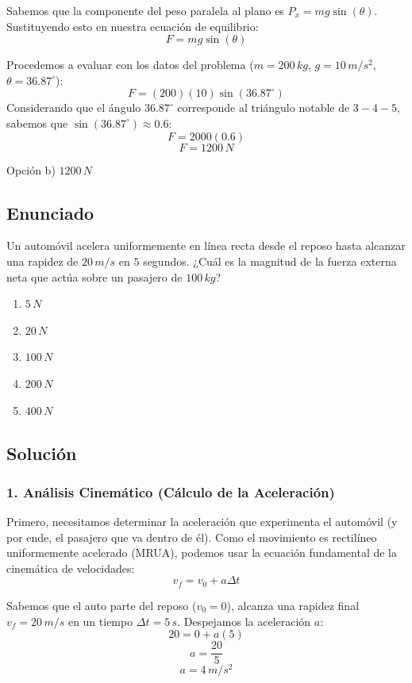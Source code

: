 \documentclass[12pt, a4paper]{article}
\begin{document}
Sabemos que la componente del peso paralela al plano es $P_x = m g \sin(\theta)$. Sustituyendo esto en nuestra ecuación de equilibrio:
$$ F = m g \sin(\theta) $$

Procedemos a evaluar con los datos del problema ($m = 200 \, \si{kg}$, $g = 10 \, \si{m/s^2}$, $\theta = 36.87^\circ$):
$$ F = (200)(10) \sin(36.87^\circ) $$
Considerando que el ángulo $36.87^\circ$ corresponde al triángulo notable de $3-4-5$, sabemos que $\sin(36.87^\circ) \approx 0.6$:
$$ F = 2000 (0.6) $$
$$ F = 1200 \, \si{N} $$

\begin{tcolorbox}[colback=green!5!white, colframe=green!50!black, title=Respuesta Final]
\centering Opción b) $1200 \, \si{N}$
\end{tcolorbox}

\newpage

\subsection*{Enunciado}
Un automóvil acelera uniformemente en línea recta desde el reposo hasta alcanzar una rapidez de $20 \, \si{m/s}$ en $5$ segundos. ¿Cuál es la magnitud de la fuerza externa neta que actúa sobre un pasajero de $100 \, \si{kg}$?
\begin{enumerate}[label=\alph*)]
    \item $5 \, \si{N}$
    \item $20 \, \si{N}$
    \item $100 \, \si{N}$
    \item $200 \, \si{N}$
    \item $400 \, \si{N}$
\end{enumerate}

\subsection*{Solución}

\subsubsection*{1. Análisis Cinemático (Cálculo de la Aceleración)}
Primero, necesitamos determinar la aceleración que experimenta el automóvil (y por ende, el pasajero que va dentro de él). Como el movimiento es rectilíneo uniformemente acelerado (MRUA), podemos usar la ecuación fundamental de la cinemática de velocidades:
$$ v_f = v_0 + a \Delta t $$

Sabemos que el auto parte del reposo ($v_0 = 0$), alcanza una rapidez final $v_f = 20 \, \si{m/s}$ en un tiempo $\Delta t = 5 \, \si{s}$. Despejamos la aceleración $a$:
$$ 20 = 0 + a (5) $$
$$ a = \frac{20}{5} $$
$$ a = 4 \, \si{m/s^2} $$
\end{document}

